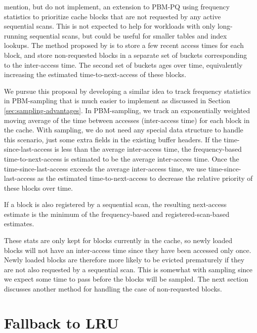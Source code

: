 \citet{pbm} mention, but do not implement, an extension to PBM-PQ using frequency statistics to prioritize cache blocks that are not requested by any active sequential scans. This is not expected to help for workloads with only long-running sequential scans, but could be useful for smaller tables and index lookups. The method proposed by \citet{pbm} is to store a few recent access times for each block, and store non-requested blocks in a separate set of buckets corresponding to the inter-access time. The second set of buckets ages over time, equivalently increasing the estimated time-to-next-access of these blocks.

We pursue this proposal by developing a similar idea to track frequency statistics in PBM-sampling that is much easier to implement as discussed in Section \ref{sec:sampling-advantages}. In PBM-sampling, we track an exponentially weighted moving average of the time between accesses (inter-access time) for each block in the cache. With sampling, we do not need any special data structure to handle this scenario, just some extra fields in the existing buffer headers. If the time-since-last-access is less than the average inter-access time, the frequency-based time-to-next-access is estimated to be the average inter-access time. Once the time-since-last-access exceeds the average inter-access time, we use time-since-last-access as the estimated time-to-next-access to decrease the relative priority of these blocks over time. 

If a block is also registered by a sequential scan, the resulting next-access estimate is the minimum of the frequency-based and registered-scan-based estimates.

These stats are only kept for blocks currently in the cache, so newly loaded blocks will not have an inter-access time since they have been accessed only once. Newly loaded blocks are therefore more likely to be evicted prematurely if they are not also requested by a sequential scan. This is somewhat with sampling since we expect some time to pass before the blocks will be sampled. The next section discusses another method for handling the case of non-requested blocks.

\section{\label{sec:lru_nr}Fallback to LRU}


